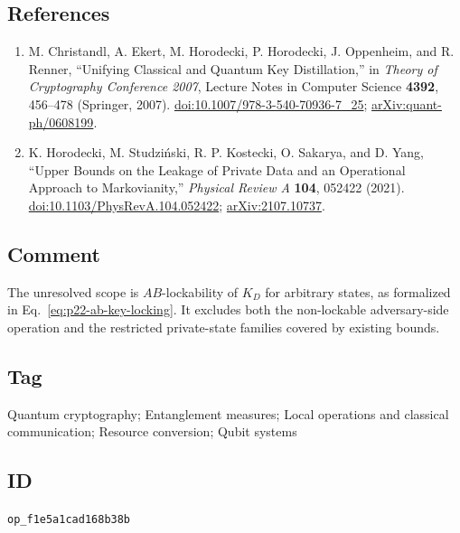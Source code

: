 \subsection*{References}

\begin{enumerate}[label={},leftmargin=4.8em,labelsep=0.5em]
  \footnotesize
  \item[\textup{[CEH+07]}]\label{ref:p22-unifying-key}
  M. Christandl, A. Ekert, M. Horodecki, P. Horodecki, J. Oppenheim, and
  R. Renner, ``Unifying Classical and Quantum Key Distillation,'' in
  \emph{Theory of Cryptography Conference 2007}, Lecture Notes in Computer
  Science \textbf{4392}, 456--478 (Springer, 2007).
  \href{https://doi.org/10.1007/978-3-540-70936-7_25}{doi:10.1007/978-3-540-70936-7\_25};
  \href{https://arxiv.org/abs/quant-ph/0608199}{arXiv:quant-ph/0608199}.

  \item[\textup{[HSK+21]}]\label{ref:p22-private-leakage}
  K. Horodecki, M. Studziński, R. P. Kostecki, O. Sakarya, and D. Yang,
  ``Upper Bounds on the Leakage of Private Data and an Operational Approach
  to Markovianity,'' \emph{Physical Review A} \textbf{104}, 052422 (2021).
  \href{https://doi.org/10.1103/PhysRevA.104.052422}{doi:10.1103/PhysRevA.104.052422};
  \href{https://arxiv.org/abs/2107.10737}{arXiv:2107.10737}.
\end{enumerate}

\subsection*{Comment}

The unresolved scope is $AB$-lockability of $K_D$ for arbitrary states, as
formalized in Eq.~\eqref{eq:p22-ab-key-locking}.  It excludes both the
non-lockable adversary-side operation and the restricted private-state
families covered by existing bounds.

\subsection*{Tag}

Quantum cryptography; Entanglement measures;
Local operations and classical communication; Resource conversion;
Qubit systems

\subsection*{ID}

\texttt{op\_f1e5a1cad168b38b}
